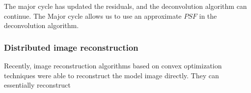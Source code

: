 The major cycle has updated the residuals, and the deconvolution algorithm can continue. The Major cycle allows us to use an approximate $PSF$ in the deconvolution algorithm.


\subsubsection{Distributed image reconstruction}

Recently, image reconstruction algorithms based on convex optimization techniques were able to reconstruct the model image directly\cite{dabbech2018cygnus}. They can essentially reconstruct 
